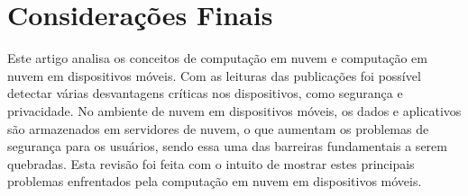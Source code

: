 \documentclass[12pt]{article}
\begin{document}
\section{Considerações Finais}

Este artigo analisa os conceitos de computação em nuvem e computação em nuvem em dispositivos móveis. Com as leituras das
publicações foi possível detectar várias desvantagens críticas nos dispositivos, como segurança e privacidade. No ambiente de
nuvem em dispositivos móveis, os dados e aplicativos são armazenados em servidores de nuvem, o que aumentam os problemas de
segurança para os usuários, sendo essa uma das barreiras fundamentais a serem quebradas. Esta revisão foi feita com o intuito de
mostrar estes principais problemas enfrentados pela computação em nuvem em dispositivos móveis.



\end{document}
